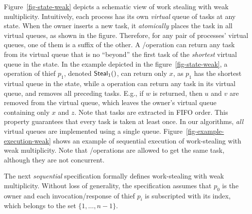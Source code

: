 Figure~\ref{fig-state-weak} depicts a schematic view of work stealing with weak multiplicity.  Intuitively, each process has its own \emph{virtual} queue of tasks at any state.  When the owner inserts a new task, it \emph{atomically} places the task in all virtual queues, as shown in the figure.  Therefore, for any pair of processes' virtual queues, one of them is a suffix of the other.  A \Take/\Steal operation can return any task from its virtual queue that is no ``beyond'' the first task of the \emph{shortest} virtual queue in the state. In the example depicted in the figure~\ref{fig-state-weak}, a \Steal operation of thief $p_1$, denoted ${\sf \small Steal}_1()$, can return only $x$, as $p_1$ has the shortest virtual queue in the state, while a \Take operation can return any task in its virtual queue, and removes all preceding tasks. E.g., if $w$ is returned, then $u$ and $v$ are removed from the virtual queue, which leaves the owner's virtual queue containing only $x$ and $z$. Note that tasks are extracted in FIFO order.  This property guarantees that every task is taken at least once.  In our algorithms, \emph{all} virtual queues are implemented using a single queue.  Figure~\ref{fig-example-execution-weak} shows an example of sequential execution of work-stealing with weak multiplicity. Note that \Take/\Steal operations are allowed to get the same task, although they are not concurrent.

The next \emph{sequential} specification formally defines work-stealing with weak multiplicity.  Without loss of generality, the specification assumes that \(p_0\) is the owner and each invocation/response of thief \(p_i\) is subscripted with its index, which belongs to the set \(\{1, \hdots, n-1\}\).



